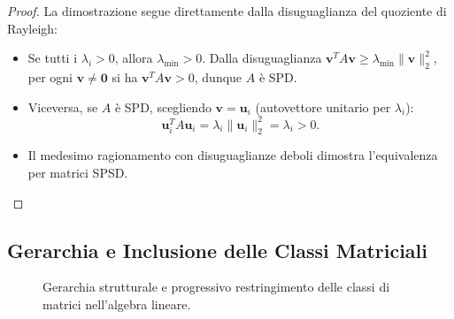 \begin{proof}
La dimostrazione segue direttamente dalla disuguaglianza del quoziente di Rayleigh:
\begin{itemize}
    \item Se tutti i $\lambda_i > 0$, allora $\lambda_{\min} > 0$. Dalla disuguaglianza $\mathbf{v}^T A \mathbf{v} \ge \lambda_{\min} \|\mathbf{v}\|_2^2$, per ogni $\mathbf{v} \neq \mathbf{0}$ si ha $\mathbf{v}^T A \mathbf{v} > 0$, dunque $A$ \`e SPD.
    \item Viceversa, se $A$ \`e SPD, scegliendo $\mathbf{v} = \mathbf{u}_i$ (autovettore unitario per $\lambda_i$):
    \begin{equation}
        \mathbf{u}_i^T A \mathbf{u}_i = \lambda_i \|\mathbf{u}_i\|_2^2 = \lambda_i > 0.
    \end{equation}
    \item Il medesimo ragionamento con disuguaglianze deboli dimostra l'equivalenza per matrici SPSD.
\end{itemize}
\end{proof}

\subsection{Gerarchia e Inclusione delle Classi Matriciali}

\begin{figure}[H]
\centering
{}
\caption{Gerarchia strutturale e progressivo restringimento delle classi di matrici nell'algebra lineare.}
\label{fig:gerarchia-matrici}
\end{figure}

